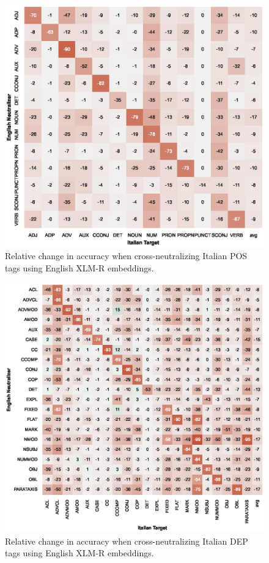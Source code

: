 \documentclass[11pt,a4paper]{article}
\begin{document}
\begin{figure}[t]
    \centering
    \includegraphics{full_figures/POS-crosslingual-it_vit_from_en_gum-accdrop.eps}
    \caption{Relative change in accuracy when cross-neutralizing Italian POS tags using English XLM-R embeddings.}
    \label{fig:xlingual_xneutr_pos_it_vit_from_en_gum}
\end{figure}

\begin{figure}[t]
    \centering
    \includegraphics{full_figures/DEP-crosslingual-it_vit_from_en_gum-accdrop.eps}
    \caption{Relative change in accuracy when cross-neutralizing Italian DEP tags using English XLM-R embeddings.}
    \label{fig:xlingual_xneutr_dep_it_vit_from_en_gum}
\end{figure}
\end{document}
